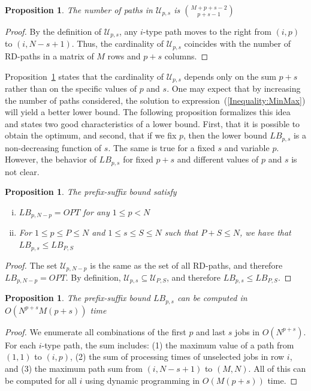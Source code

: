 \documentclass{article}
\theoremstyle{thmstyleone}%
\newtheorem{proposition}[theorem]{Proposition}%
\theoremstyle{thmstyletwo}%
\theoremstyle{thmstylethree}%
\begin{document}
\begin{proposition}
\label{prop:CardinalityU}
The number of paths in $\mathcal{U}_{p,s}$ is $\binom{M + p + s - 2}{p + s - 1}$
\end{proposition}
\begin{proof}
By the definition of $\mathcal{U}_{p,s}$, any $i$-type path moves to the right from $(i,p)$ to $(i, N - s + 1)$. Thus, the cardinality of $\mathcal{U}_{p,s}$ coincides with the number of RD-paths in a matrix of $M$ rows and $p + s$ columns.
\end{proof}

Proposition~\ref{prop:CardinalityU} states that the cardinality of $\mathcal{U}_{p, s}$ depends only on the sum $p + s$ rather than on the specific values of $p$ and $s$. One may expect that by increasing the number of paths considered, the solution to expression~(\ref{Inequality:MinMax}) will yield a better lower bound. 
The following proposition formalizes this idea and states two good characteristics of a lower bound. First, that it is possible to obtain the optimum, and second, that if we fix $p$, then the lower bound $LB_{p, s}$ is a non-decreasing function of $s$. 
The same is true for a fixed $s$ and variable $p$. 
However, the behavior of $LB_{p, s}$ for fixed $p + s$ and different values of $p$ and $s$ is not clear. 

\begin{proposition}
\label{prop:BoundBehaviour}
The prefix-suffix bound satisfy 
\begin{enumerate}[i)]
    \item $LB_{p, N - p} = OPT$ for any $1 \leq p < N$
\item For $1 \leq p \leq P \leq N$ and $1 \leq s \leq S \leq N$ such that $P + S \leq N$, we have that $LB_{p,s} \leq LB_{P, S}$
\end{enumerate}
\end{proposition}
\begin{proof}
The set $\mathcal{U}_{p, N-p}$ is the same as the set of all RD-paths, and therefore $LB_{p, N - p} = OPT$. 
By definition, $\mathcal{U}_{p, s} \subseteq \mathcal{U}_{P, S}$, and therefore $LB_{p, s} \leq LB_{P, S}$. 
\end{proof}

\begin{proposition}
\label{prop:Complexity}
The prefix-suffix bound $LB_{p,s}$ can be computed in $O(N^{p + s}M(p + s))$ time
\end{proposition}
\begin{proof}
We enumerate all combinations of the first $p$ and last $s$ jobs in $O(N^{p+s})$. For each $i$-type path, the sum includes: (1) the maximum value of a path from $(1,1)$ to $(i,p)$, (2) the sum of processing times of unselected jobs in row $i$, and (3) the maximum path sum from $(i, N-s+1)$ to $(M,N)$. All of this can be computed for all $i$ using dynamic programming in $O(M(p + s))$ time. 
\end{proof}
\end{document}
